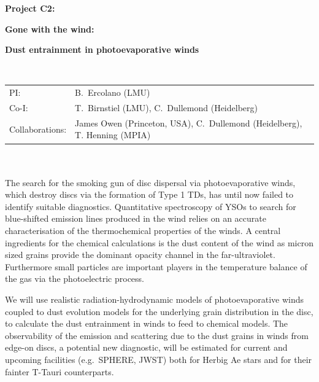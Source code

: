 \documentclass[10pt,fleqn,twoside]{article}
\begin{document}
\newpage


\setcounter{page}{1}

\centerline{\huge\bf\Tcol
%
%
%
%
%
 Project C2:}
\vspace{1em}

\centerline{\LARGE\bf\Tcol Gone with the wind:}\vspace{0.3em}
\centerline{\LARGE\bf\Tcol Dust entrainment in photoevaporative winds}

%
%
%
%
%
\vskip1.0cm


\\
\begin{tabular}{ll}
{\textsf{PI:}}                   & B.~Ercolano (LMU) \\
{\textsf{Co-I:}}                & T.~Birnstiel (LMU), C.~Dullemond (Heidelberg)\\
{\textsf{Collaborations:}}      &  James Owen (Princeton, USA),
                                    C.~Dullemond
                                  (Heidelberg), T. Henning (MPIA)\\

\end{tabular}


\vspace{1em}
 \\

\vspace{1em}
\\
The search for the smoking gun of disc dispersal via photoevaporative
winds, which destroy discs via the formation of Type 1 TDs,  has until
now failed to identify suitable diagnostics. Quantitative spectroscopy of
YSOs to search for blue-shifted emission lines produced in the wind
relies on an accurate characterisation of the thermochemical
properties of the winds. A central ingredients for the chemical
calculations is the dust content of the wind as micron sized grains
provide the dominant opacity channel in the far-ultraviolet.
Furthermore small particles are important players in the temperature
balance of the gas via the photoelectric process.  

We will use realistic radiation-hydrodynamic models of
photoevaporative winds coupled to dust evolution models for the
underlying grain distribution in the disc, to calculate the dust
entrainment in winds to feed to chemical models. The observability of
the emission and scattering due to the dust grains in winds from edge-on
discs, a potential new diagnostic, will be estimated for current and
upcoming facilities (e.g.\ SPHERE, JWST) both for Herbig
Ae stars and for their fainter T-Tauri counterparts.  
\end{document}
